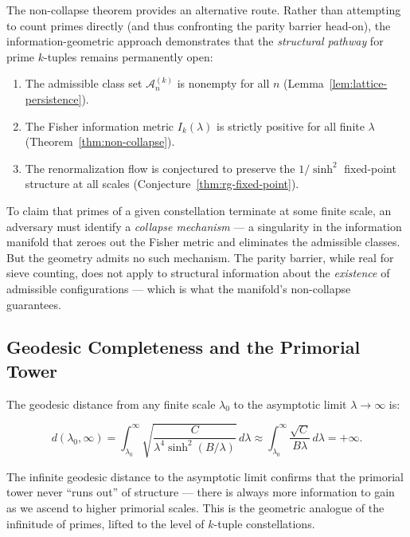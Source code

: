\documentclass[11pt]{article}
\theoremstyle{remark}
\begin{document}
The non-collapse theorem provides an alternative route. Rather than
attempting to count primes directly (and thus confronting the parity
barrier head-on), the information-geometric approach demonstrates that
the \emph{structural pathway} for prime $k$-tuples remains permanently
open:

\begin{enumerate}
    \item The admissible class set $\mathcal{A}_n^{(k)}$ is nonempty for
    all $n$ (Lemma~\ref{lem:lattice-persistence}).
    \item The Fisher information metric $I_k(\lambda)$ is strictly
    positive for all finite $\lambda$ (Theorem~\ref{thm:non-collapse}).
    \item The renormalization flow is conjectured to preserve the $1/\sinh^2$ fixed-point
    structure at all scales (Conjecture~\ref{thm:rg-fixed-point}).
\end{enumerate}

To claim that primes of a given constellation terminate at some finite
scale, an adversary must identify a \emph{collapse mechanism} — a
singularity in the information manifold that zeroes out the Fisher metric
and eliminates the admissible classes. But the geometry admits no such
mechanism. The parity barrier, while real for sieve counting, does not
apply to structural information about the \emph{existence} of admissible
configurations — which is what the manifold's non-collapse guarantees.

\subsection{Geodesic Completeness and the Primorial Tower}

The geodesic distance from any finite scale $\lambda_0$ to the
asymptotic limit $\lambda \to \infty$ is:

\begin{equation}
d(\lambda_0, \infty) = \int_{\lambda_0}^{\infty}
\sqrt{\frac{C}{\lambda^4 \sinh^2(B/\lambda)}} \, d\lambda
\approx \int_{\lambda_0}^{\infty} \frac{\sqrt{C}}{B \lambda} \, d\lambda
= +\infty.
\end{equation}

The infinite geodesic distance to the asymptotic limit confirms that
the primorial tower never ``runs out'' of structure — there is always
more information to gain as we ascend to higher primorial scales. This
is the geometric analogue of the infinitude of primes, lifted to the
level of $k$-tuple constellations.
\end{document}
